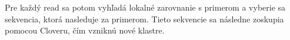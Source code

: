 Pre každý read sa potom vyhľadá lokalné zarovnanie s primerom a vyberie sa sekvencia, ktorá nasleduje za primerom.
Tieto sekvencie sa následne zoskupia pomocou Cloveru, čím vzniknú nové klastre.
